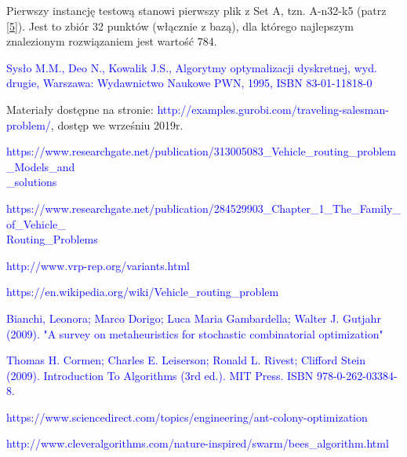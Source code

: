 \documentclass[a4paper, twoside, 12pt, justified]{article}
\begin{document}
	Pierwszy instancję testową stanowi pierwszy plik z Set A, tzn. A-n32-k5 (patrz \hyperlink{tests}{[5]}).
	Jest to zbiór 32 punktów (włącznie z bazą), dla którego najlepszym znalezionym rozwiązaniem jest wartość 784. 
	
	
	
	\newpage
	
	\renewcommand\refname{Źródła}
	\begin{thebibliography}{}

		{\hypertarget{komiwojazer}{\textcolor{blue}{
		Sysło M.M., Deo N., Kowalik J.S., Algorytmy optymalizacji dyskretnej, wyd. drugie, Warszawa: Wydawnictwo Naukowe PWN, 1995, ISBN 83-01-11818-0}}}
	
		{\hypertarget{tsp_math_model}{Materiały dostępne na stronie: \textcolor{blue}{
		http://examples.gurobi.com/traveling-salesman-problem/}, dostęp we wrześniu 2019r.}}
	
	 
	 	{\hypertarget{vrp_all}{\textcolor{blue}{
		https://www.researchgate.net/publication/313005083\_Vehicle\_routing\_problem\_Models\_and\\\_solutions}}}
		
		{\hypertarget{cvrp-irnich}{\textcolor{blue}{https://www.researchgate.net/publication/284529903\_Chapter\_1\_The\_Family\_of\_Vehicle\_\\Routing\_Problems}}}
		
		{\hypertarget{vrp_variants}{\textcolor{blue}{http://www.vrp-rep.org/variants.html}}}
		
		{\hypertarget{vrp_solving}{\textcolor{blue}{https://en.wikipedia.org/wiki/Vehicle\_routing\_problem}}}
		
		{\hypertarget{metaheurystyka}{\textcolor{blue}{Bianchi, Leonora; Marco Dorigo; Luca Maria Gambardella; Walter J. Gutjahr (2009). "A survey on metaheuristics for stochastic combinatorial optimization"}}}
		
		{\hypertarget{algorithm}{\textcolor{blue}{
		Thomas H. Cormen; Charles E. Leiserson; Ronald L. Rivest; Clifford Stein (2009). Introduction To Algorithms (3rd ed.). MIT Press. ISBN 978-0-262-03384-8.}}}
		
		
		{\hypertarget{ant}{\textcolor{blue}{
		https://www.sciencedirect.com/topics/engineering/ant-colony-optimization}}}
	
		{\hypertarget{bees}{\textcolor{blue}{
		http://www.cleveralgorithms.com/nature-inspired/swarm/bees\_algorithm.html}}}
	

\end{thebibliography}
\end{document}
